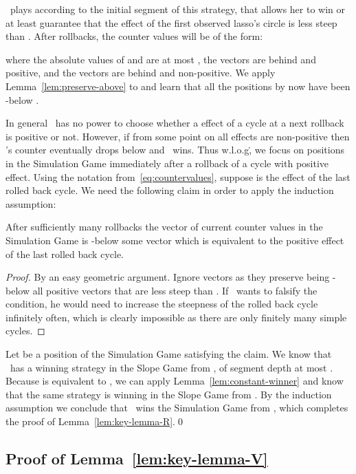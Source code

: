 \R\ plays according to the initial segment of this strategy, that allows her to win or at least
guarantee that the effect of the first observed lasso's circle is less steep than .
After  rollbacks, the counter values will be of the form:

where the absolute values of  and  are at most ,
the vectors  are behind  and positive,
and the vectors  are behind  and non-positive.
We apply Lemma~\ref{lem:preserve-above} to  and learn
that all the positions by now have been -below .

In general \R\ has no power to choose whether a effect of a cycle at a next rollback is positive or not.
However, if from some point on all effects are non-positive then \V's counter
eventually drops below  and \R\ wins.
Thus w.l.o.g\., we focus on positions in the Simulation Game immediately after a rollback of a
cycle with positive effect.
Using the notation from~\eqref{eq:countervalues}, suppose  
is the effect of the last rolled back cycle.
We need the following claim in order to apply the induction assumption:
\begin{claim}
  After sufficiently many rollbacks the vector  of current counter values
  in the Simulation Game is -below some vector 
  which is equivalent to the positive effect  of the last rolled back cycle.
\end{claim}
\begin{proof}
  By an easy geometric argument. Ignore vectors  as they
  preserve being -below all positive vectors that are less steep
  than .  If \V\ wants to falsify the condition, he would need to
  increase the steepness of the rolled back cycle infinitely often, which is
  clearly impossible as there are only finitely many simple cycles.
\end{proof}

Let  be a position of the Simulation Game satisfying the claim.
We know that \R\ has a winning strategy in the Slope Game from , of segment depth at most .
Because  is equivalent to , we can apply
Lemma~\ref{lem:constant-winner} and know that the same strategy is winning in the
Slope Game from .
By the induction assumption we conclude that \R\ wins the Simulation Game
from , which completes the proof of
Lemma~\ref{lem:key-lemma-R}.\qed



\subsection{Proof of Lemma~\ref{lem:key-lemma-V}}  \label{sec:proof-V}

